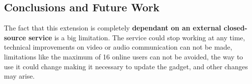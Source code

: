 \subsection{Conclusions and Future Work}
The fact that this extension is completely \textbf{dependant on an external closed-source service} is a big limitation. The service could stop working at any time, technical improvements on video or audio communication can not be made, limitations like the maximum of 16 online users can not be avoided, the way to use it could change making it necessary to update the gadget, and other changes may arise.
